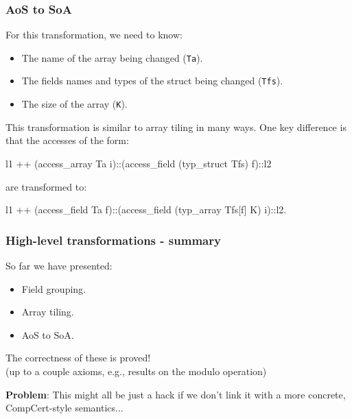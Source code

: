 \begin{frame}[fragile]
\frametitle{AoS to SoA}

For this transformation, we need to know:
\begin{itemize}
	\item The name of the array being changed (\texttt{Ta}).
	\item The fields names and types of the struct being changed (\texttt{Tfs}).
	\item The size of the array (\texttt{K}).
\end{itemize}

\bigskip \pause

This transformation is similar to array tiling in many ways. One key difference is that the accesses
of the form:

\begin{coqs}
  l1 ++ (access_array Ta i)::(access_field (typ_struct Tfs) f)::l2
\end{coqs}

are transformed to:

\begin{coqs}
  l1 ++ (access_field Ta f)::(access_field (typ_array Tfs[f] K) i)::l2.
\end{coqs}

\end{frame}


\begin{frame}[fragile]
\frametitle{High-level transformations - summary}

So far we have presented:

\vspace{1em}
\begin{itemize}
	\setlength\itemsep{1.5em}
	\item Field grouping.
	\item Array tiling.
	\item AoS to SoA.
\end{itemize}

\bigskip \pause

The correctness of these is proved! \\ %
(up to a couple axioms, e.g., results on the modulo operation)

\bigskip \pause

\textbf{Problem}: This might all be just a hack if we don't link it with a more concrete, CompCert-style semantics...

\end{frame}


